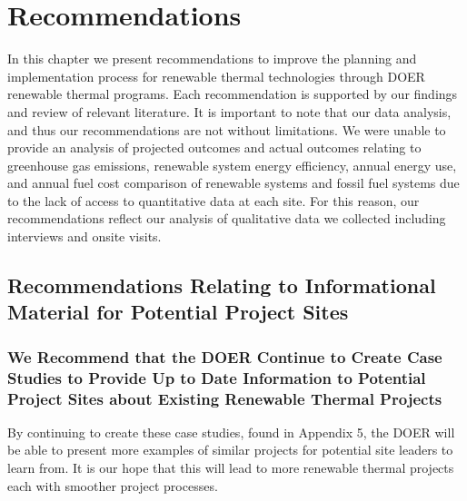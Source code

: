 
\chapter{Recommendations}
\par In this chapter we present recommendations to improve the planning and implementation process for renewable thermal technologies through DOER renewable thermal programs. Each recommendation is supported by our findings and review of relevant literature. It is important to note that our data analysis, and thus our recommendations are not without limitations. We were unable to provide an analysis of projected outcomes and actual outcomes relating to greenhouse gas emissions, renewable system energy efficiency, annual energy use, and annual fuel cost comparison of renewable systems and fossil fuel systems due to the lack of access to quantitative data at each site. For this reason, our recommendations reflect our analysis of qualitative data we collected including interviews and onsite visits.

\section{Recommendations Relating to Informational Material for Potential Project Sites}
\subsection{We Recommend that the DOER Continue to Create Case Studies to Provide Up to Date Information to Potential Project Sites about Existing Renewable Thermal Projects}  
\par By continuing to create these case studies, found in Appendix 5, the DOER will be able to present more examples of similar projects for potential site leaders to learn from. It is our hope that this will lead to more renewable thermal projects each with smoother project processes.

